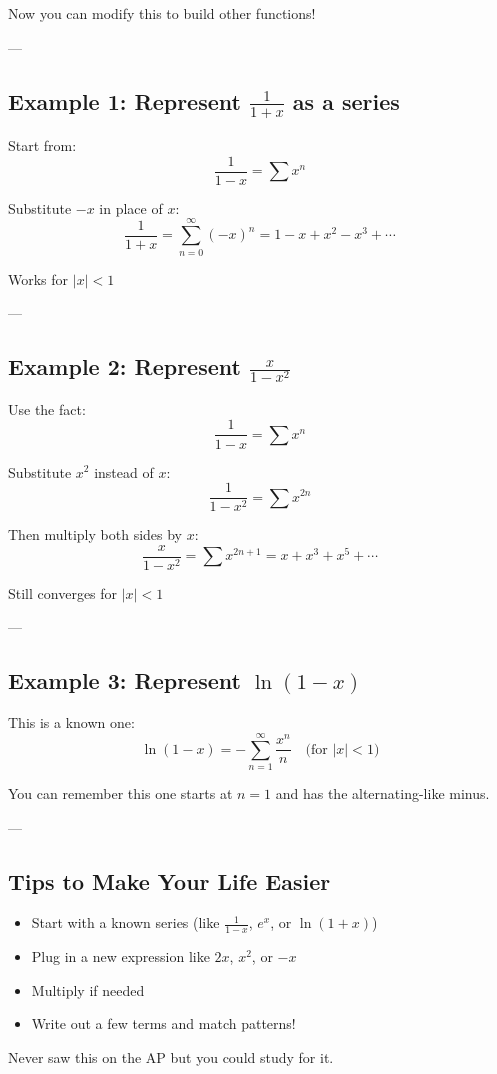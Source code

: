 \documentclass{article}
\begin{document}
Now you can modify this to build other functions!

---

\subsection*{Example 1: Represent \( \frac{1}{1 + x} \) as a series}

Start from:
\[
\frac{1}{1 - x} = \sum x^n
\]

Substitute \( -x \) in place of \( x \):
\[
\frac{1}{1 + x} = \sum_{n=0}^{\infty} (-x)^n = 1 - x + x^2 - x^3 + \cdots
\]

 Works for \( |x| < 1 \)

---

\subsection*{Example 2: Represent \( \frac{x}{1 - x^2} \)}

Use the fact:
\[
\frac{1}{1 - x} = \sum x^n
\]

Substitute \( x^2 \) instead of \( x \):
\[
\frac{1}{1 - x^2} = \sum x^{2n}
\]

Then multiply both sides by \( x \):
\[
\frac{x}{1 - x^2} = \sum x^{2n+1} = x + x^3 + x^5 + \cdots
\]

 Still converges for \( |x| < 1 \)

---

\subsection*{Example 3: Represent \( \ln(1 - x) \)}

This is a known one:
\[
\ln(1 - x) = -\sum_{n=1}^{\infty} \frac{x^n}{n}
\quad\text{(for } |x| < 1\text{)}
\]

You can remember this one starts at \( n=1 \) and has the alternating-like minus.

---

\subsection*{Tips to Make Your Life Easier}
\begin{itemize}
  \item Start with a known series (like \( \frac{1}{1 - x} \), \( e^x \), or \( \ln(1 + x) \))
  \item Plug in a new expression like \( 2x \), \( x^2 \), or \( -x \)
  \item Multiply if needed
  \item Write out a few terms and match patterns!
\end{itemize}

\begin{tcolorbox}[colback=blue!5,colframe=blue!80!black,title=Bonus Tip]
Never saw this on the AP but you could study for it.
\end{tcolorbox}
\end{document}

